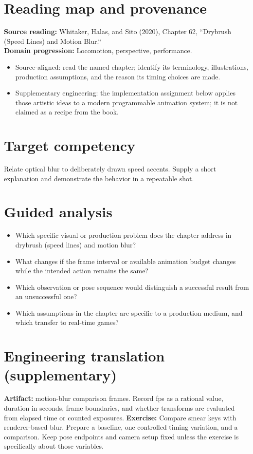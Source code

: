 \documentclass[10pt,letterpaper]{article}
\begin{document}
\makedoctitle
\makedocsummary

\section{Reading map and provenance}
\textbf{Source reading:} Whitaker, Halas, and Sito (2020), Chapter 62, ``Drybrush (Speed Lines) and Motion Blur.``\\
\textbf{Domain progression:} Locomotion, perspective, performance.
\begin{itemize}
\item Source-aligned: read the named chapter; identify its terminology, illustrations, production assumptions, and the reason its timing choices are made.
\item Supplementary engineering: the implementation assignment below applies those artistic ideas to a modern programmable animation system; it is not claimed as a recipe from the book.
\end{itemize}
\section{Target competency}
Relate optical blur to deliberately drawn speed accents. Supply a short explanation and demonstrate the behavior in a repeatable shot.
\section{Guided analysis}
\begin{itemize}
\item Which specific visual or production problem does the chapter address in drybrush (speed lines) and motion blur?
\item What changes if the frame interval or available animation budget changes while the intended action remains the same?
\item Which observation or pose sequence would distinguish a successful result from an unsuccessful one?
\item Which assumptions in the chapter are specific to a production medium, and which transfer to real-time games?
\end{itemize}
\section{Engineering translation (supplementary)}
\textbf{Artifact:} motion-blur comparison frames. Record fps as a rational value, duration in seconds, frame boundaries, and whether transforms are evaluated from elapsed time or counted exposures.
\textbf{Exercise:} Compare smear keys with renderer-based blur. Prepare a baseline, one controlled timing variation, and a comparison. Keep pose endpoints and camera setup fixed unless the exercise is specifically about those variables.
\end{document}
